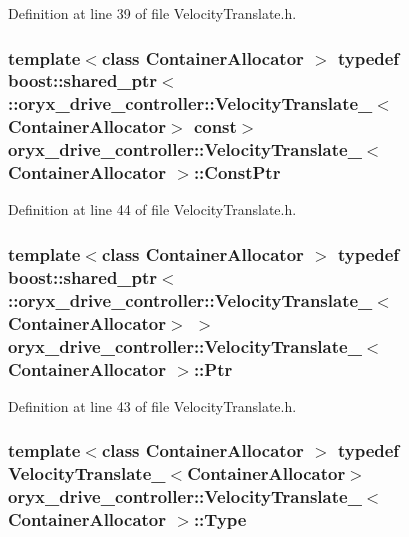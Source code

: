 \-Definition at line 39 of file \-Velocity\-Translate.\-h.

\subsubsection[{\-Const\-Ptr}]{\setlength{\rightskip}{0pt plus 5cm}template$<$class Container\-Allocator $>$ typedef boost\-::shared\-\_\-ptr$<$ \-::{\bf oryx\-\_\-drive\-\_\-controller\-::\-Velocity\-Translate\-\_\-}$<$\-Container\-Allocator$>$ const$>$ {\bf oryx\-\_\-drive\-\_\-controller\-::\-Velocity\-Translate\-\_\-}$<$ \-Container\-Allocator $>$\-::{\bf \-Const\-Ptr}}\label{structoryx__drive__controller_1_1VelocityTranslate___ae3592b21a961c7acee1b0a72364fdea6}


\-Definition at line 44 of file \-Velocity\-Translate.\-h.

\subsubsection[{\-Ptr}]{\setlength{\rightskip}{0pt plus 5cm}template$<$class Container\-Allocator $>$ typedef boost\-::shared\-\_\-ptr$<$ \-::{\bf oryx\-\_\-drive\-\_\-controller\-::\-Velocity\-Translate\-\_\-}$<$\-Container\-Allocator$>$ $>$ {\bf oryx\-\_\-drive\-\_\-controller\-::\-Velocity\-Translate\-\_\-}$<$ \-Container\-Allocator $>$\-::{\bf \-Ptr}}\label{structoryx__drive__controller_1_1VelocityTranslate___ac9a187e4555086efa901a8e33aaaf598}


\-Definition at line 43 of file \-Velocity\-Translate.\-h.

\subsubsection[{\-Type}]{\setlength{\rightskip}{0pt plus 5cm}template$<$class Container\-Allocator $>$ typedef {\bf \-Velocity\-Translate\-\_\-}$<$\-Container\-Allocator$>$ {\bf oryx\-\_\-drive\-\_\-controller\-::\-Velocity\-Translate\-\_\-}$<$ \-Container\-Allocator $>$\-::{\bf \-Type}}\label{structoryx__drive__controller_1_1VelocityTranslate___a152a7c9d5b3b6c74c82984926e97b601}


